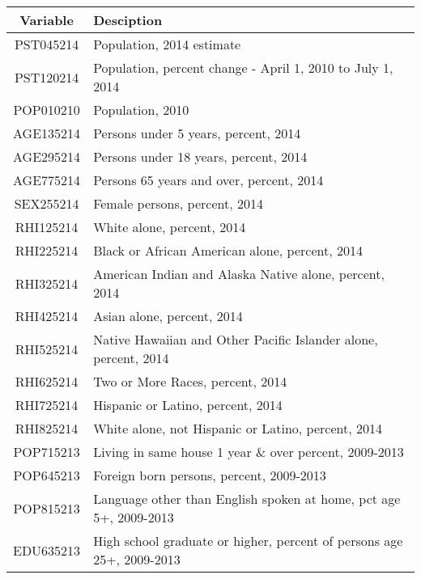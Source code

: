 \begin{tabularx}{\linewidth}[H]{@{}cX@{}}
    \caption{Example of an table}\\
    \toprule
    \textbf{Variable} & \textbf{Desciption} \\[6pt]
    \midrule
    \endhead
    PST045214 & Population, 2014 estimate                                              \\
	PST120214 & Population, percent change - April 1, 2010 to July 1, 2014             \\
	POP010210 & Population, 2010                                                       \\
	AGE135214 & Persons under 5 years, percent, 2014                                   \\
	AGE295214 & Persons under 18 years, percent, 2014                                  \\
	AGE775214 & Persons 65 years and over, percent, 2014                               \\
	SEX255214 & Female persons, percent, 2014                                          \\
	RHI125214 & White alone, percent, 2014                                             \\
	RHI225214 & Black or African American alone, percent, 2014                         \\
	RHI325214 & American Indian and Alaska Native alone, percent, 2014                 \\
	RHI425214 & Asian alone, percent, 2014                                             \\
	RHI525214 & Native Hawaiian and Other Pacific Islander alone, percent, 2014        \\
	RHI625214 & Two or More Races, percent, 2014                                       \\
	RHI725214 & Hispanic or Latino, percent, 2014                                      \\
	RHI825214 & White alone, not Hispanic or Latino, percent, 2014                     \\
	POP715213 & Living in same house 1 year \& over percent, 2009-2013                \\
	POP645213 & Foreign born persons, percent, 2009-2013                               \\
	POP815213 & Language other than English spoken at home, pct age 5+, 2009-2013      \\
	EDU635213 & High school graduate or higher, percent of persons age 25+, 2009-2013  \\

\end{tabularx}
